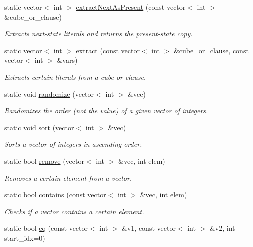 \begin{DoxyCompactItemize}
static vector$<$ int $>$ \hyperlink{classUtils_a9251f04947864aaaac7e459987913429}{extract\-Next\-As\-Present} (const vector$<$ int $>$ \&cube\-\_\-or\-\_\-clause)
\begin{DoxyCompactList}\small\item\em Extracts next-\/state literals and returns the present-\/state copy. \end{DoxyCompactList}\item 
static vector$<$ int $>$ \hyperlink{classUtils_a21f2b014ac53ca027864c57e24a60195}{extract} (const vector$<$ int $>$ \&cube\-\_\-or\-\_\-clause, const vector$<$ int $>$ \&vars)
\begin{DoxyCompactList}\small\item\em Extracts certain literals from a cube or clause. \end{DoxyCompactList}\item 
static void \hyperlink{classUtils_a71efa1aa570b356a328e95008fb65ad8}{randomize} (vector$<$ int $>$ \&vec)
\begin{DoxyCompactList}\small\item\em Randomizes the order (not the value) of a given vector of integers. \end{DoxyCompactList}\item 
static void \hyperlink{classUtils_a2843ae3d849c66ebd72baea26fbd7580}{sort} (vector$<$ int $>$ \&vec)
\begin{DoxyCompactList}\small\item\em Sorts a vector of integers in ascending order. \end{DoxyCompactList}\item 
static bool \hyperlink{classUtils_a15b142132eb40445f51b1f1bb89b85f3}{remove} (vector$<$ int $>$ \&vec, int elem)
\begin{DoxyCompactList}\small\item\em Removes a certain element from a vector. \end{DoxyCompactList}\item 
static bool \hyperlink{classUtils_a84611c8a027ac12426219cb4d59765aa}{contains} (const vector$<$ int $>$ \&vec, int elem)
\begin{DoxyCompactList}\small\item\em Checks if a vector contains a certain element. \end{DoxyCompactList}\item 
static bool \hyperlink{classUtils_a5dc062d4cf872c0d69924116879715ab}{eq} (const vector$<$ int $>$ \&v1, const vector$<$ int $>$ \&v2, int start\-\_\-idx=0)

\end{DoxyCompactItemize}
